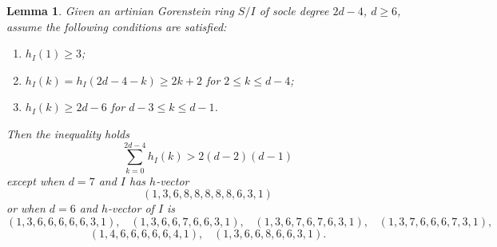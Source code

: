 \documentclass[10pt,a4paper]{amsart}
\newtheorem{lem}{Lemma}
\begin{document}
\begin{lem}\label{auxiliary_cii}
		Given an artinian Gorenstein ring $S/I$ of socle degree $2d-4$, $d\geqslant 6$, assume the following conditions are satisfied:
		\begin{enumerate}
		\item[\emph{(1)}] $h_I(1)\geqslant 3$;
		\item[\emph{(2)}] $h_I(k)=h_I(2d-4-k)\geqslant 2k+2$ for $2\leqslant k \leqslant d-4$;
		\item[\emph{(3)}]  $h_I(k)\geqslant 2d-6$ for $d-3\leqslant k \leqslant d-1$.
		\end{enumerate}
		Then the inequality holds
		\begin{equation}\label{inequality_for_singularities}\tag{4.2}
			 \sum\limits_{k=0}^{2d-4} h_I(k)>2(d-2)(d-1)
		\end{equation}
		except when $d= 7$ and $I$ has $h$-vector
		$$(1,3,6,8,8,8,8,8,6,3,1)$$
		or when $d=6$ and $h$-vector of $I$ is
		$$(1,3,6,6,6,6,6,3,1),\hspace{10pt} (1,3,6,6,7,6,6,3,1), \hspace{10pt}(1,3,6,7,6,7,6,3,1), \hspace{10pt} (1,3,7,6,6,6,7,3,1), $$
		 $$(1,4,6,6,6,6,6,4,1), \hspace{10pt} (1,3,6,6,8,6,6,3,1).$$
\end{lem}
\end{document}
